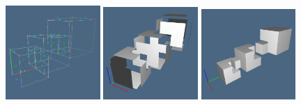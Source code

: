 \documentclass[11pt,oneside]{article}    %
\begin{document}
\begin{figure}[htbp] %
   \centering
   \includegraphics[height=0.332\textwidth,width=0.32\textwidth]{images/test11a1} 
   \includegraphics[height=0.332\textwidth,width=0.32\textwidth]{images/test11a2} 
   \includegraphics[height=0.332\textwidth,width=0.32\textwidth]{images/test11a3} 


\end{figure}
\end{document}
